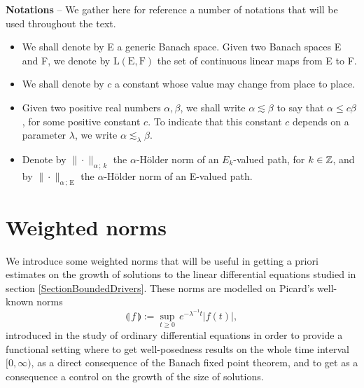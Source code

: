 \documentclass[11pt,a4paper]{amsart}
\renewcommand{\leq}{\leqslant}
\renewcommand{\geq}{\geqslant}
\numberwithin{equation}{section} %
\begin{document}
\bigskip

\noindent \textbf{Notations} -- We gather here for reference a number of notations that will be used throughout the text.
\begin{itemize}
   \item We shall denote by E a generic Banach space. Given two Banach spaces E and F, we denote by $\textrm{L}(\textrm{E},\textrm{F})$ the set of continuous linear maps from E to F. \vspace{0.1cm}
   \item We shall denote by $c$ a constant whose value may change from place to place. \vspace{0.1cm}
   \item Given two positive real numbers $\alpha,\beta$, we shall write $\alpha \lesssim \beta$ to say that $\alpha\leq c\beta$, for some positive constant $c$. To indicate that this constant $c$ depends on a parameter $\lambda$, we write $\alpha \lesssim_\lambda \beta$. \vspace{0.1cm}
   \item Denote by $\|\cdot\|_{\alpha\,;\,k}$ the $\alpha$-H\"older norm of an $E_k$-valued path, for $k\in\mathbb{Z}$, and by $\|\cdot\|_{\alpha\,;\,\textrm{E}}$ the $\alpha$-H\"older norm of an E-valued path.
\end{itemize}


\bigskip

\section{Weighted norms}
\label{SectionWeightedNorms}

We introduce  some weighted norms that will be useful in getting a priori estimates on the growth of solutions to the linear differential equations studied in section \ref{SectionBoundedDrivers}. These norms are modelled on Picard's well-known norms
$$
\llparenthesis\, f \,\rrparenthesis := \underset{t\geq 0}{\sup}\,e^{-\lambda^{-1} t}\big| f(t) \big|,
$$
introduced in the study of ordinary differential equations in order to provide a functional setting where to get well-posedness results on the whole time interval $[0,\infty)$, as a direct consequence of the Banach fixed point theorem, and to get as a consequence a control on the growth of the size of solutions. 

\medskip
\end{document}
